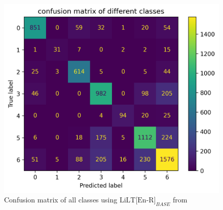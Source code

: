 \begin{figure}[!ht]
    \centering
    \includegraphics[width=0.6 \textwidth]{chapters/images/experiments_and_results/En_LiLT_30_output.png}
    \caption{Confusion matrix of all classes using \(\text{LiLT[En-R]}_{BASE}\) from  }
    \label{fig:multi_calss_en_lilt}
\end{figure}
    





